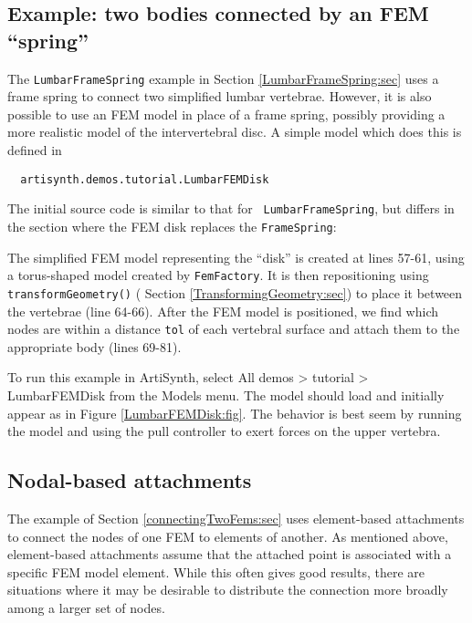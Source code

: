 \subsection{Example: two bodies connected by an FEM ``spring''}
\label{sec:fem:LumarFEMDisk}

The {\tt LumbarFrameSpring} example in
Section \ref{LumbarFrameSpring:sec} uses a frame spring to connect two
simplified lumbar vertebrae. However, it is also possible to use an
FEM model in place of a frame spring, possibly providing a more
realistic model of the intervertebral disc. A simple model which does
this is defined in
%
\begin{verbatim}
  artisynth.demos.tutorial.LumbarFEMDisk
\end{verbatim}
%
The initial source code is similar to that for {\tt
LumbarFrameSpring}, but differs in the section where the FEM disk
replaces the {\tt FrameSpring}:
\lstset{numbers=left}
\iflatexml

\else

\fi
\lstset{numbers=none}

The simplified FEM model representing the ``disk'' is created at lines
57-61, using a torus-shaped model created by {\tt FemFactory}.  It is
then repositioning using {\tt transformGeometry()} (
Section \ref{TransformingGeometry:sec}) to place it between the
vertebrae (line 64-66).  After the FEM model is positioned, we find
which nodes are within a distance {\tt tol} of each vertebral surface
and attach them to the appropriate body (lines 69-81).

To run this example in ArtiSynth, select {\sf All demos > tutorial >
LumbarFEMDisk} from the {\sf Models} menu. The model should load and
initially appear as in Figure \ref{LumbarFEMDisk:fig}.  The
behavior is best seem by running the model and using the pull
controller to exert forces on the upper vertebra.

\subsection{Nodal-based attachments}
\label{sec:fem:nodalAttachments}

The example of Section \ref{connectingTwoFems:sec} uses element-based
attachments to connect the nodes of one FEM to elements of another.
As mentioned above, element-based attachments assume that the attached
point is associated with a specific FEM model element. 
While this often gives good results, there are situations where it may
be desirable to distribute the connection more broadly among a larger
set of nodes. 


